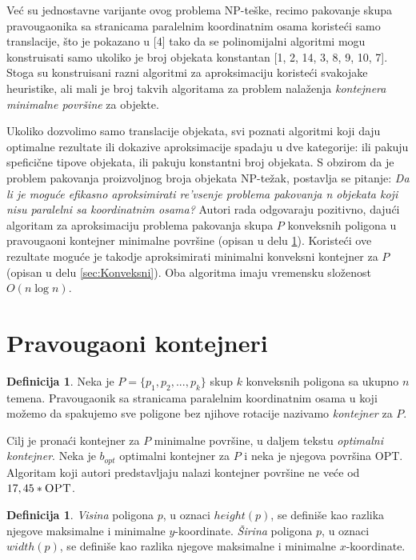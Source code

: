 \documentclass[a4paper]{article}
\theoremstyle{plain}
\theoremstyle{definition}
\newtheorem{defn}[thm]{Definicija} %
\begin{document}
Ve\'c{} su jednostavne varijante ovog problema NP-te\v{s}ke, recimo pakovanje skupa pravougaonika sa stranicama paralelnim koordinatnim osama koriste\'c{}i samo translacije, \v{s}to je pokazano u \cite{paper} [4] tako da se polinomijalni algoritmi mogu konstruisati samo ukoliko je broj objekata konstantan \cite{paper} [1, 2, 14, 3, 8, 9, 10, 7]. Stoga su konstruisani razni algoritmi za aproksimaciju koriste\'c{}i svakojake heuristike, ali mali je broj takvih algoritama za problem nala\v{z}enja \emph{kontejnera minimalne povr\v{s}ine} za objekte. 

Ukoliko dozvolimo samo translacije objekata, svi poznati algoritmi koji daju optimalne rezultate ili dokazive aproksimacije spadaju u dve kategorije: ili pakuju spefici\v{c}ne tipove objekata, ili pakuju konstantni broj objekata. S obzirom da je problem pakovanja proizvoljnog broja objekata NP-te\v{z}ak, postavlja se pitanje: \emph{Da li je mogu\'c{}e efikasno aproksimirati re'v{s}enje problema pakovanja n objekata koji nisu paralelni sa koordinatnim osama?} Autori rada odgovaraju pozitivno, daju\'c{}i algoritam za aproksimaciju problema pakovanja skupa $P$ konveksnih poligona u pravougaoni kontejner minimalne povr\v{s}ine (opisan u delu \ref{sec:Pravougaoni}). Koriste\'c{}i ove rezultate mogu\'c{}e je takodje aproksimirati minimalni konveksni kontejner za $P$ (opisan u delu \ref{sec:Konveksni}). Oba algoritma imaju vremensku slo\v{z}enost $O(n\log{}n)$.


\section{Pravougaoni kontejneri}
\label{sec:Pravougaoni}

\begin{defn}
    Neka je $P = \{ p_{1}, p_{2}, ... , p_{k} \}$ skup $k$ konveksnih poligona sa ukupno $n$ temena. Pravougaonik sa stranicama paralelnim koordinatnim osama u koji mo\v{z}emo da spakujemo sve poligone bez njihove rotacije nazivamo \emph{kontejner} za $P$.    
\end{defn}

Cilj je prona\'c{}i kontejner za $P$ minimalne povr\v{s}ine, u daljem tekstu \emph{optimalni kontejner}. Neka je $b_{opt}$ optimalni kontejner za $P$ i neka je njegova povr\v{s}ina \textsc{OPT}. Algoritam koji autori predstavljaju nalazi kontejner povr\v{s}ine ne ve\'c{}e od $17,45 * \textsc{OPT}$.

\begin{defn}
    \emph{Visina} poligona $p$, u oznaci \emph{$height(p)$}, se defini\v{s}e kao razlika njegove maksimalne i minimalne $y$-koordinate. \emph{\v{S}irina} poligona $p$, u oznaci \emph{$width(p)$}, se defini\v{s}e kao razlika njegove maksimalne i minimalne $x$-koordinate.
\end{defn}
\end{document}
